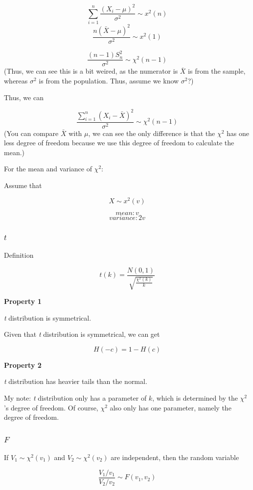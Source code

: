 \documentclass[]{book}
\begin{document}
\[\sum_{i=1}^n \frac{(X_i-\mu)^2}{\sigma^2} \sim x^2(n)\]
\[\frac{n(\bar{X}-\mu)^2}{\sigma^2}\sim x^2(1)\]

\[\frac{(n-1)S_n^2}{\sigma^2} \sim \chi^2(n-1)\]
(Thus, we can see this is a bit weired, as the numerator is \(\bar{X}\) is from the sample, whereas \(\sigma^2\) is from the population. Thus, assume we know \(\sigma^2\)?)

Thus, we can

\[\frac{\sum_{i=1}^n(X_i-\bar{X})^2}{\sigma^2}\sim \chi^2(n-1)\]
(You can compare \(\bar{X}\) with \(\mu\), we can see the only difference is that the \(\chi^2\) has one less degree of freedom because we use this degree of freedom to calculate the mean.)

For the mean and variance of \(\chi^2\):

Assume that

\[X \sim x^2(v)\]

\[mean:v\]
\[variance: 2v\]

\hypertarget{t}{%
\subsubsection{\texorpdfstring{\(t\)}{t}}\label{t}}

Definition

\[t(k)=\frac{N(0,1)}{\sqrt{\frac{\chi^2(k)}{k}}}\]

\textbf{Property 1}

\emph{t} distribution is symmetrical.

Given that \emph{t} distribution is symmetrical, we can get

\[H(-c)=1-H(c)\]

\textbf{Property 2}

\emph{t} distribution has heavier tails than the normal.

My note: \emph{t} distribution only has a parameter of \(k\), which is determined by the \(\chi^2\)'s degree of freedom. Of course, \(\chi^2\) also only has one parameter, namely the degree of freedom.

\hypertarget{f}{%
\subsubsection{\texorpdfstring{\(F\)}{F}}\label{f}}

If \(V_1 \sim \chi^2(v_1)\) and \(V_2 \sim \chi^2(v_2)\) are independent, then the random variable

\[\frac{V_1/v_1}{V_2/v_2}\sim F(v_1,v_2)\]
\end{document}
